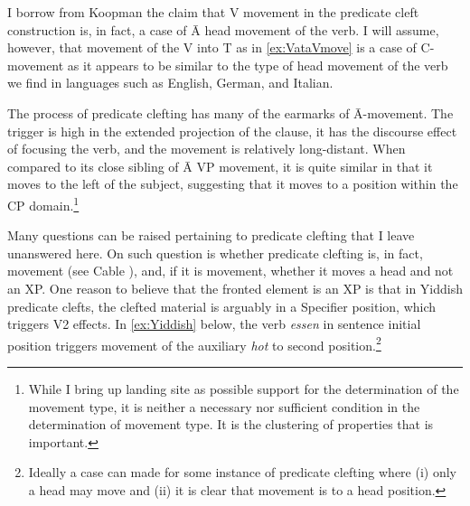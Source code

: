 \documentclass[output=paper,colorlinks,citecolor=brown,
]{langscibook}
\begin{document}

\ea \label{ex:VataVmove}

I borrow from Koopman the claim that V movement in the predicate cleft construction is, in fact, a case of \=A head movement of the verb.  I will assume, however, that movement of the V into T as in \ref{ex:VataVmove} is a case of C-movement as it appears to be similar to the type of head movement of the verb we find in languages such as English, German, and Italian.  

The process of predicate clefting has many of the earmarks of \=A-movement.  The trigger is high in the extended projection of the clause, it has the discourse effect of focusing the verb, and the movement is relatively long-distant.  When compared to its close sibling of \=A VP movement, it is quite similar in that it moves to the left of the subject, suggesting that it moves to a position within the CP domain.\footnote{While I bring up landing site as possible support for the determination of the movement type, it is neither a necessary nor sufficient condition in the determination of movement type.  It is the clustering of properties that is important.}

Many questions can be raised pertaining to predicate clefting that I leave unanswered here.  On such question is whether predicate clefting is, in fact, movement (see Cable \citeyear{Cable:2004}), and, if it is movement, whether it moves a head and not an XP.  One reason to believe that the fronted element is an XP is that in Yiddish predicate clefts, the clefted material is arguably in a Specifier position, which triggers V2 effects.  In \ref{ex:Yiddish} below, the verb \textit{essen} in sentence initial position triggers movement of the auxiliary \textit{hot} to second position.\footnote{Ideally a case can made for some instance of predicate clefting where (i) only a head may move and (ii) it is clear that movement is to a head position.}
\end{document}
